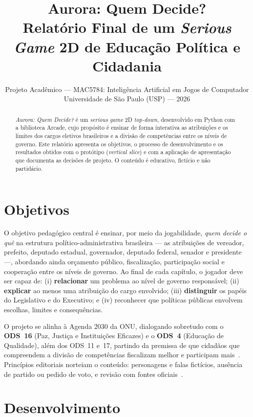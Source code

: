 \documentclass[10pt,twocolumn]{article}
\title{\vspace{-1.2em}\textbf{Aurora: Quem Decide?}\\[0.2em]
\large Relat\'orio Final de um \emph{Serious Game} 2D de Educa\c{c}\~ao Pol\'itica e Cidadania}
\author{Projeto Acad\^emico --- MAC5784: Intelig\^encia Artificial em Jogos de Computador\\
Universidade de S\~ao Paulo (USP) --- 2026}
\date{}
\begin{document}
\maketitle

\begin{abstract}
\noindent \emph{Aurora: Quem Decide?} \'e um \emph{serious game} 2D \emph{top-down},
desenvolvido em Python com a biblioteca Arcade, cujo prop\'osito \'e ensinar de
forma interativa as atribui\c{c}\~oes e os limites dos cargos eletivos brasileiros
e a divis\~ao de compet\^encias entre os n\'iveis de governo. Este relat\'orio
apresenta os objetivos, o processo de desenvolvimento e os resultados obtidos
com o prot\'otipo (\emph{vertical slice}) e com a aplica\c{c}\~ao de apresenta\c{c}\~ao
que documenta as decis\~oes de projeto. O conte\'udo \'e educativo, fict\'icio e
n\~ao partid\'ario.
\end{abstract}

\section{Objetivos}

O objetivo pedag\'ogico central \'e ensinar, por meio da jogabilidade, \emph{quem
decide o qu\^e} na estrutura pol\'itico-administrativa brasileira --- as atribui\c{c}\~oes
de vereador, prefeito, deputado estadual, governador, deputado federal, senador e
presidente ---, abordando ainda or\c{c}amento p\'ublico, fiscaliza\c{c}\~ao, participa\c{c}\~ao
social e coopera\c{c}\~ao entre os n\'iveis de governo. Ao final de cada cap\'itulo, o
jogador deve ser capaz de: (i) \textbf{relacionar} um problema ao n\'ivel de governo
respons\'avel; (ii) \textbf{explicar} ao menos uma atribui\c{c}\~ao do cargo envolvido;
(iii) \textbf{distinguir} os pap\'eis do Legislativo e do Executivo; e (iv)
reconhecer que pol\'iticas p\'ublicas envolvem escolhas, limites e consequ\^encias.

O projeto se alinha \`a Agenda 2030 da ONU, dialogando sobretudo com o
\textbf{ODS~16} (Paz, Justi\c{c}a e Institui\c{c}\~oes Eficazes) e o \textbf{ODS~4}
(Educa\c{c}\~ao de Qualidade), al\'em dos ODS~11 e~17, partindo da premissa de que
cidad\~aos que compreendem a divis\~ao de compet\^encias fiscalizam melhor e participam
mais~\cite{ods16,ods4,agenda2030}. Princ\'ipios editoriais norteiam o conte\'udo:
personagens e falas fict\'icios, aus\^encia de partido ou pedido de voto, e revis\~ao
com fontes oficiais~\cite{constituicao,camara,senado}.

\section{Desenvolvimento}
\end{document}
